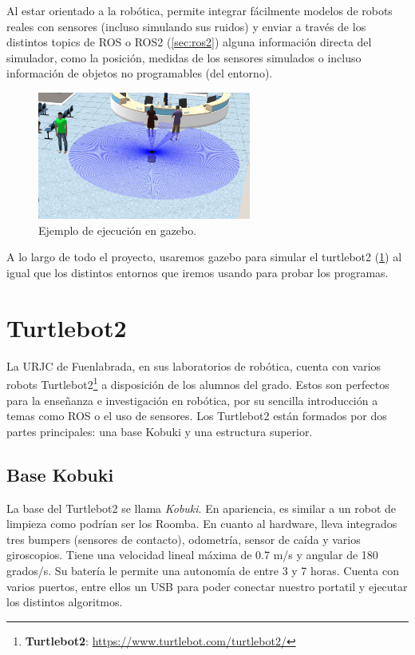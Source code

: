 Al estar orientado a la robótica, permite integrar fácilmente modelos de robots reales con sensores (incluso simulando sus ruidos) y enviar a través de los distintos topics de ROS o ROS2 (\ref{sec:ros2}) alguna información directa del simulador, como la posición, medidas de los sensores simulados o incluso información de objetos no programables (del entorno).

\begin{figure} [H]
    \begin{center}
        \includegraphics[width=7cm]{figs/c3/gazebo_sim.png}
    \end{center}
    \caption[Simulador Gazebo.]{Ejemplo de ejecución en gazebo.}
    \label{fig:gazebo_example}
\end{figure}

A lo largo de todo el proyecto, usaremos gazebo para simular el turtlebot2 (\ref{sec:turtlebot2}) al igual que los distintos entornos que iremos usando para probar los programas.
 
\section{Turtlebot2}
\label{sec:turtlebot2}

La URJC de Fuenlabrada, en sus laboratorios de robótica, cuenta con varios robots Turtlebot2\footnote{\textbf{Turtlebot2}: \url{https://www.turtlebot.com/turtlebot2/}} a disposición de los alumnos del grado. Estos son perfectos para la enseñanza e investigación en robótica, por su sencilla introducción a temas como ROS o el uso de sensores. Los Turtlebot2 están formados por dos partes principales: una base Kobuki y una estructura superior.


\subsection{Base Kobuki}
\label{subsec:turtlebot2_base}

La base del Turtlebot2 se llama \textit{Kobuki}. En apariencia, es similar a un robot de limpieza como podrían ser los Roomba. En cuanto al hardware, lleva integrados tres bumpers (sensores de contacto), odometría, sensor de caída y varios giroscopios. Tiene una velocidad lineal máxima de 0.7 m/s y angular de 180 grados/s. Su batería le permite una autonomía de entre 3 y 7 horas. Cuenta con varios puertos, entre ellos un USB para poder conectar nuestro portatil y ejecutar los distintos algoritmos.\\

